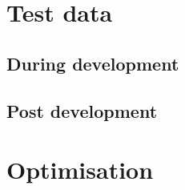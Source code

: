 \documentclass[11pt]{report}
\begin{document}
\section{Test data}
\subsection{During development}
\subsection{Post development}

\section{Optimisation}
\end{document}
